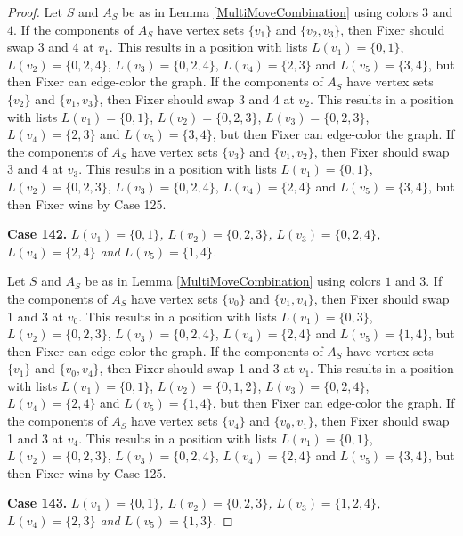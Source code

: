 \documentclass[12pt]{amsart}
\theoremstyle{plain}
\theoremstyle{definition}
\theoremstyle{remark}
\begin{document}
\begin{proof}
Let $S$ and $A_S$ be as in Lemma \ref{MultiMoveCombination} using colors $3$ and $4$. If the components of $A_S$ have vertex sets $\{v_1\}$ and $\{v_2, v_3\}$, then Fixer should swap 3 and 4 at $v_1$. This results in a position with lists $L(v_1) = \{0, 1\}$, $L(v_2) = \{0, 2, 4\}$, $L(v_3) = \{0, 2, 4\}$, $L(v_4) = \{2, 3\}$ and $L(v_5) = \{3, 4\}$, but then Fixer can edge-color the graph.
If the components of $A_S$ have vertex sets $\{v_2\}$ and $\{v_1, v_3\}$, then Fixer should swap 3 and 4 at $v_2$. This results in a position with lists $L(v_1) = \{0, 1\}$, $L(v_2) = \{0, 2, 3\}$, $L(v_3) = \{0, 2, 3\}$, $L(v_4) = \{2, 3\}$ and $L(v_5) = \{3, 4\}$, but then Fixer can edge-color the graph.
If the components of $A_S$ have vertex sets $\{v_3\}$ and $\{v_1, v_2\}$, then Fixer should swap 3 and 4 at $v_3$. This results in a position with lists $L(v_1) = \{0, 1\}$, $L(v_2) = \{0, 2, 3\}$, $L(v_3) = \{0, 2, 4\}$, $L(v_4) = \{2, 4\}$ and $L(v_5) = \{3, 4\}$, but then Fixer wins by Case 125.

\noindent\textbf{Case 142.  }\textit{$L(v_1) = \{0, 1\}$, $L(v_2) = \{0, 2, 3\}$, $L(v_3) = \{0, 2, 4\}$, $L(v_4) = \{2, 4\}$ and $L(v_5) = \{1, 4\}$.}

Let $S$ and $A_S$ be as in Lemma \ref{MultiMoveCombination} using colors $1$ and $3$. If the components of $A_S$ have vertex sets $\{v_0\}$ and $\{v_1, v_4\}$, then Fixer should swap 1 and 3 at $v_0$. This results in a position with lists $L(v_1) = \{0, 3\}$, $L(v_2) = \{0, 2, 3\}$, $L(v_3) = \{0, 2, 4\}$, $L(v_4) = \{2, 4\}$ and $L(v_5) = \{1, 4\}$, but then Fixer can edge-color the graph.
If the components of $A_S$ have vertex sets $\{v_1\}$ and $\{v_0, v_4\}$, then Fixer should swap 1 and 3 at $v_1$. This results in a position with lists $L(v_1) = \{0, 1\}$, $L(v_2) = \{0, 1, 2\}$, $L(v_3) = \{0, 2, 4\}$, $L(v_4) = \{2, 4\}$ and $L(v_5) = \{1, 4\}$, but then Fixer can edge-color the graph.
If the components of $A_S$ have vertex sets $\{v_4\}$ and $\{v_0, v_1\}$, then Fixer should swap 1 and 3 at $v_4$. This results in a position with lists $L(v_1) = \{0, 1\}$, $L(v_2) = \{0, 2, 3\}$, $L(v_3) = \{0, 2, 4\}$, $L(v_4) = \{2, 4\}$ and $L(v_5) = \{3, 4\}$, but then Fixer wins by Case 125.

\noindent\textbf{Case 143.  }\textit{$L(v_1) = \{0, 1\}$, $L(v_2) = \{0, 2, 3\}$, $L(v_3) = \{1, 2, 4\}$, $L(v_4) = \{2, 3\}$ and $L(v_5) = \{1, 3\}$.}


\end{proof}
\end{document}
